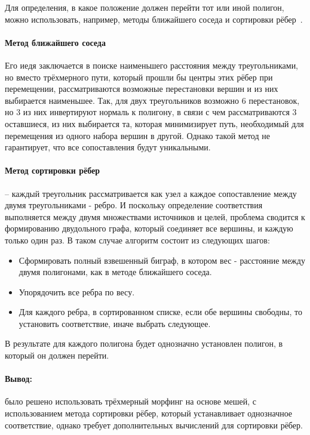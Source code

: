 \par Для определения, в какое положение должен перейти тот или иной полигон, можно использовать, например, методы ближайшего соседа и сортировки рёбер~\cite{morphing}. 
\paragraph{Метод ближайшего соседа} Его иедя заключается в поиске наименьшего расстояния между треугольниками, но вместо трёхмерного пути, который прошли бы центры этих рёбер при перемещении, рассматриваются возможные перестановки вершин и из них выбирается наименьшее. Так, для двух треугольников возможно 6 перестановок, но 3 из них инвертируют нормаль к полигону, в связи с чем рассматриваются 3 оставшиеся, из них выбирается та, которая минимизирует путь, необходимый для перемещения из одного набора вершин в другой. Однако такой метод не гарантирует, что все сопоставления будут уникальными.
\paragraph{Метод сортировки рёбер} -- каждый треугольник рассматривается как узел а каждое сопоставление между двумя треугольниками - ребро. И поскольку определение соответствия выполняется между двумя множествами источников и целей, проблема сводится к формированию двудольного графа, который соединяет все вершины, и каждую только один раз. В таком случае алгоритм состоит из следующих шагов:
\begin{itemize}
	\item Сформировать полный взвешенный биграф, в котором вес - расстояние между двумя полигонами, как в методе ближайшего соседа.
	\item Упорядочить все ребра по весу.
	\item Для каждого ребра, в сортированном списке, если обе вершины свободны, то установить соответствие, иначе выбрать следующее.
\end{itemize}
В результате для каждого полигона будет однозначно установлен полигон, в который он должен перейти.

\paragraph{Вывод:} было решено использовать трёхмерный морфинг на основе мешей, с использованием метода сортировки рёбер, который устанавливает однозначное соответствие, однако требует дополнительных вычислений для сортировки рёбер.

